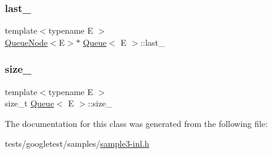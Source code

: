 \mbox{\label{classQueue_a7466dca4f96147c9124af582ab170df0}} 
\subsubsection{\texorpdfstring{last\+\_\+}{last\_}}
{\footnotesize\ttfamily template$<$typename E $>$ \\
\hyperlink{classQueueNode}{Queue\+Node}$<$E$>$$\ast$ \hyperlink{classQueue}{Queue}$<$ E $>$\+::last\+\_\+\hspace{0.3cm}{\ttfamily [private]}}

\mbox{\label{classQueue_a7ac3c0717d894e1aecc56f4ddb35c7ea}} 
\subsubsection{\texorpdfstring{size\+\_\+}{size\_}}
{\footnotesize\ttfamily template$<$typename E $>$ \\
size\+\_\+t \hyperlink{classQueue}{Queue}$<$ E $>$\+::size\+\_\+\hspace{0.3cm}{\ttfamily [private]}}



The documentation for this class was generated from the following file\+:\begin{DoxyCompactItemize}
\item 
tests/googletest/samples/\hyperlink{sample3-inl_8h}{sample3-\/inl.\+h}\end{DoxyCompactItemize}
